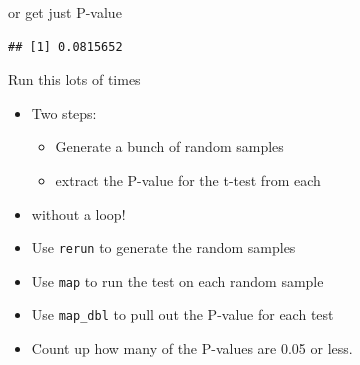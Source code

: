 \documentclass[
  ignorenonframetext,
]{beamer}
\newenvironment{Shaded}{\begin{snugshade}}{\end{snugshade}}
\newcommand{\DataTypeTok}[1]{\textcolor[rgb]{0.13,0.29,0.53}{#1}}
\newcommand{\DecValTok}[1]{\textcolor[rgb]{0.00,0.00,0.81}{#1}}
\newcommand{\KeywordTok}[1]{\textcolor[rgb]{0.13,0.29,0.53}{\textbf{#1}}}
\newcommand{\NormalTok}[1]{#1}
\newcommand{\OperatorTok}[1]{\textcolor[rgb]{0.81,0.36,0.00}{\textbf{#1}}}
\providecommand{\tightlist}{%
  \setlength{\itemsep}{0pt}\setlength{\parskip}{0pt}}
\begin{document}
\begin{frame}[fragile]{or get just P-value}
\protect\hypertarget{or-get-just-p-value}{}

\begin{Shaded}
\end{Shaded}

\begin{verbatim}
## [1] 0.0815652
\end{verbatim}

\end{frame}

\begin{frame}[fragile]{Run this lots of times}
\protect\hypertarget{run-this-lots-of-times}{}

\begin{itemize}
\tightlist
\item
  Two steps:

  \begin{itemize}
  \tightlist
  \item
    Generate a bunch of random samples
  \item
    extract the P-value for the t-test from each
  \end{itemize}
\item
  without a loop!
\item
  Use \texttt{rerun} to generate the random samples
\item
  Use \texttt{map} to run the test on each random sample
\item
  Use \texttt{map\_dbl} to pull out the P-value for each test
\item
  Count up how many of the P-values are 0.05 or less.
\end{itemize}

\end{frame}
\end{document}
